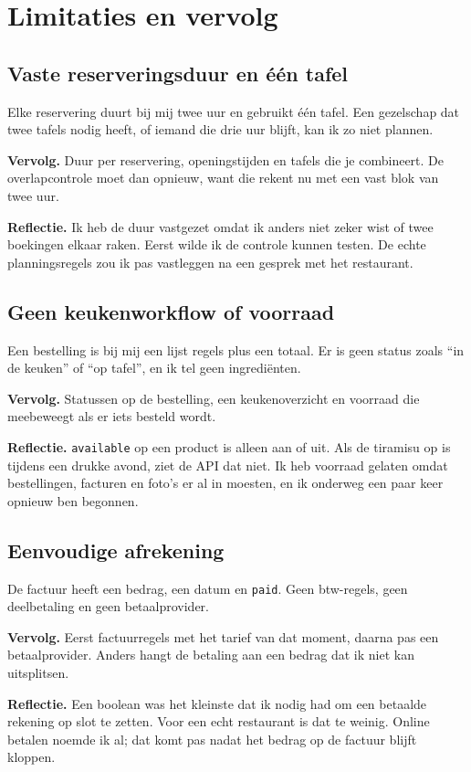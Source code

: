 \documentclass[11pt]{article}
\begin{document}
\section{Limitaties en vervolg}

\subsection{Vaste reserveringsduur en één tafel}
Elke reservering duurt bij mij twee uur en gebruikt één tafel. Een gezelschap
dat twee tafels nodig heeft, of iemand die drie uur blijft, kan ik zo niet
plannen.

\textbf{Vervolg.} Duur per reservering, openingstijden en tafels die je
combineert. De overlapcontrole moet dan opnieuw, want die rekent nu met een
vast blok van twee uur.

\textbf{Reflectie.} Ik heb de duur vastgezet omdat ik anders niet zeker wist of
twee boekingen elkaar raken. Eerst wilde ik de controle kunnen testen. De echte
planningsregels zou ik pas vastleggen na een gesprek met het restaurant.

\subsection{Geen keukenworkflow of voorraad}
Een bestelling is bij mij een lijst regels plus een totaal. Er is geen status
zoals ``in de keuken'' of ``op tafel'', en ik tel geen ingrediënten.

\textbf{Vervolg.} Statussen op de bestelling, een keukenoverzicht en voorraad
die meebeweegt als er iets besteld wordt.

\textbf{Reflectie.} \texttt{available} op een product is alleen aan of uit. Als
de tiramisu op is tijdens een drukke avond, ziet de API dat niet. Ik heb voorraad
gelaten omdat bestellingen, facturen en foto's er al in moesten, en ik onderweg
een paar keer opnieuw ben begonnen.

\subsection{Eenvoudige afrekening}
De factuur heeft een bedrag, een datum en \texttt{paid}. Geen btw-regels, geen
deelbetaling en geen betaalprovider.

\textbf{Vervolg.} Eerst factuurregels met het tarief van dat moment, daarna pas
een betaalprovider. Anders hangt de betaling aan een bedrag dat ik niet kan
uitsplitsen.

\textbf{Reflectie.} Een boolean was het kleinste dat ik nodig had om een betaalde
rekening op slot te zetten. Voor een echt restaurant is dat te weinig. Online
betalen noemde ik al; dat komt pas nadat het bedrag op de factuur blijft kloppen.
\end{document}
